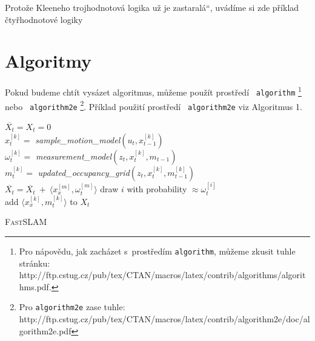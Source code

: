 \documentclass[a4paper,11pt]{article}
\newcommand\quot[1]{\quotedblbase #1\textquotedblleft}
\begin{document}
\begin{table}[ht]
\begin{center}
			\caption{Protože Kleeneho trojhodnotová logika už je  \quot{zastaralá}, uvádíme si zde příklad čtyřhodnotové logiky}
			
			\label{tab:tabulka2}
		\end{center}
	\end{table} 
	\bigskip
	
	\newpage
	
	\section{Algoritmy}\label{section:3}
	
	\noindent Pokud budeme chtít vysázet algoritmus, můžeme použít prostředí 
	\texttt{ algorithm}
	\footnote{Pro nápovědu, jak zacházet s~prostředím 
		\texttt{algorithm}, můžeme zkusit tuhle stránku:\\ http://ftp.cstug.cz/pub/tex/CTAN/macros/latex/contrib/algorithms/algorithms.pdf.} nebo \texttt{ algorithm2e}
	\footnote{Pro \texttt{algorithm2e} zase tuhle: http://ftp.cstug.cz/pub/tex/CTAN/macros/latex/contrib/algorithm2e/doc/algorithm2e.pdf}. 
	Příklad použití prostředí \texttt{ algorithm2e} viz Algoritmus 1.\\
	
	
	\begin{algorithm}[H]
		\label{algoritmus1} 
		\SetNlSty{}{}{:}
		\medskip 
		\SetNlSkip{-1em}
		\Indp\Indpp
		$\overline{X_t}=X_t=0$\\
		{
			$x_t^{[k]}=$ \textit{sample\_motion\_model}$(u_t,x_{t-1}^{[k]})$\\
			$\omega_t^{[k]} =$ \textit{measurement\_model}$(z_t,x_t^{[k]},m_{t-1})$\\
			$m_t^{[k]}=$ \textit{updated\_occupancy\_grid}$(z_t,x_t^{[k]},m_{t-1}^{[k]})$\\
			$\overline{X_t} = \overline{X_t}\ +\ \langle x_x^{[m]}, \omega_t^{[m]}\rangle$
		}
		{
			draw $i$ with probability $\approx \omega_t^{[i]}$ \\
			add $\langle x_x^{[k]}, m_t^{[k]}\rangle$ to $X_t$
		}
		\caption{\textsc{FastSLAM}}
		\label{algoritmus1}
	\end{algorithm}
	\bigskip
	
	
	
\end{document}
